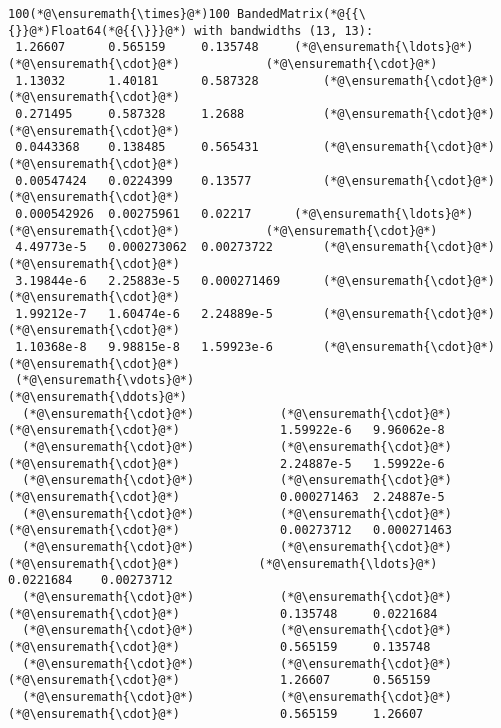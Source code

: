 \documentclass[12pt,landscape]{article}
\begin{document}
{\begin{lstlisting}
100(*@\ensuremath{\times}@*)100 BandedMatrix(*@{{\{}}@*)Float64(*@{{\}}}@*) with bandwidths (13, 13):
 1.26607      0.565159     0.135748     (*@\ensuremath{\ldots}@*)   (*@\ensuremath{\cdot}@*)            (*@\ensuremath{\cdot}@*) 
 1.13032      1.40181      0.587328         (*@\ensuremath{\cdot}@*)            (*@\ensuremath{\cdot}@*) 
 0.271495     0.587328     1.2688           (*@\ensuremath{\cdot}@*)            (*@\ensuremath{\cdot}@*) 
 0.0443368    0.138485     0.565431         (*@\ensuremath{\cdot}@*)            (*@\ensuremath{\cdot}@*) 
 0.00547424   0.0224399    0.13577          (*@\ensuremath{\cdot}@*)            (*@\ensuremath{\cdot}@*) 
 0.000542926  0.00275961   0.02217      (*@\ensuremath{\ldots}@*)   (*@\ensuremath{\cdot}@*)            (*@\ensuremath{\cdot}@*) 
 4.49773e-5   0.000273062  0.00273722       (*@\ensuremath{\cdot}@*)            (*@\ensuremath{\cdot}@*) 
 3.19844e-6   2.25883e-5   0.000271469      (*@\ensuremath{\cdot}@*)            (*@\ensuremath{\cdot}@*) 
 1.99212e-7   1.60474e-6   2.24889e-5       (*@\ensuremath{\cdot}@*)            (*@\ensuremath{\cdot}@*) 
 1.10368e-8   9.98815e-8   1.59923e-6       (*@\ensuremath{\cdot}@*)            (*@\ensuremath{\cdot}@*) 
 (*@\ensuremath{\vdots}@*)                                      (*@\ensuremath{\ddots}@*)               
  (*@\ensuremath{\cdot}@*)            (*@\ensuremath{\cdot}@*)            (*@\ensuremath{\cdot}@*)              1.59922e-6   9.96062e-8
  (*@\ensuremath{\cdot}@*)            (*@\ensuremath{\cdot}@*)            (*@\ensuremath{\cdot}@*)              2.24887e-5   1.59922e-6
  (*@\ensuremath{\cdot}@*)            (*@\ensuremath{\cdot}@*)            (*@\ensuremath{\cdot}@*)              0.000271463  2.24887e-5
  (*@\ensuremath{\cdot}@*)            (*@\ensuremath{\cdot}@*)            (*@\ensuremath{\cdot}@*)              0.00273712   0.000271463
  (*@\ensuremath{\cdot}@*)            (*@\ensuremath{\cdot}@*)            (*@\ensuremath{\cdot}@*)           (*@\ensuremath{\ldots}@*)  0.0221684    0.00273712
  (*@\ensuremath{\cdot}@*)            (*@\ensuremath{\cdot}@*)            (*@\ensuremath{\cdot}@*)              0.135748     0.0221684
  (*@\ensuremath{\cdot}@*)            (*@\ensuremath{\cdot}@*)            (*@\ensuremath{\cdot}@*)              0.565159     0.135748
  (*@\ensuremath{\cdot}@*)            (*@\ensuremath{\cdot}@*)            (*@\ensuremath{\cdot}@*)              1.26607      0.565159
  (*@\ensuremath{\cdot}@*)            (*@\ensuremath{\cdot}@*)            (*@\ensuremath{\cdot}@*)              0.565159     1.26607
\end{lstlisting}


}
\end{document}
